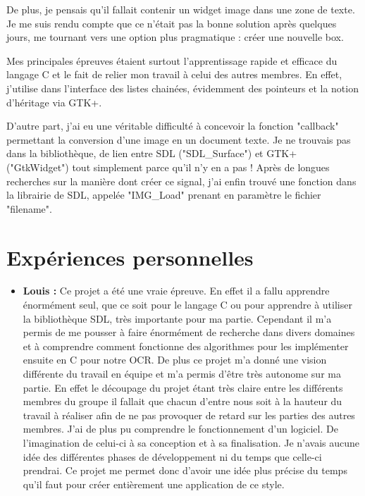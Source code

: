 \documentclass[12pt]{report}
\begin{document}
De plus, je pensais qu’il fallait contenir un widget image dans une zone de texte. Je me suis rendu compte que ce n’était pas la bonne solution après quelques jours, me tournant vers une option plus pragmatique : créer une nouvelle box.

Mes principales épreuves étaient surtout l’apprentissage rapide et efficace du langage C et le fait de relier mon travail à celui des autres membres. En effet, j’utilise dans l’interface des listes chainées, évidemment des pointeurs et la notion d’héritage via GTK+. 

\newpage

D’autre part, j’ai eu une véritable difficulté à concevoir la fonction "callback" permettant la conversion d’une image en un document texte. Je ne trouvais pas dans la bibliothèque, de lien entre SDL ("SDL\_Surface") et GTK+ ("GtkWidget") tout simplement parce qu’il n’y en a pas ! Après de longues recherches sur la manière dont créer ce signal, j’ai enfin trouvé une fonction dans la librairie de SDL, appelée "IMG\_Load" prenant en paramètre le fichier "filename".


\chapter{Expériences personnelles}

\begin{itemize}
	\item \textbf{Louis :} Ce projet a été une vraie épreuve. En effet il a fallu apprendre énormément seul, que ce soit pour le langage C ou pour apprendre à utiliser la bibliothèque SDL, très importante pour ma partie. Cependant il m’a permis de me pousser à faire énormément de recherche dans divers domaines et à comprendre comment fonctionne des algorithmes pour les implémenter ensuite en C pour notre OCR. De plus ce projet m’a donné une vision différente du travail en équipe et m’a permis d’être très autonome sur ma partie. En effet le découpage du projet étant très claire entre les différents membres du groupe il fallait que chacun d’entre nous soit à la hauteur du travail à réaliser afin de ne pas provoquer de retard sur les parties des autres membres. J’ai de plus pu comprendre le fonctionnement d’un logiciel. De l’imagination de celui-ci à sa conception et à sa finalisation. Je n’avais aucune idée des différentes phases de développement ni du temps que celle-ci prendrai. Ce projet me permet donc d’avoir une idée plus précise du temps qu’il faut pour créer entièrement une application de ce style.
\end{itemize}
\end{document}

